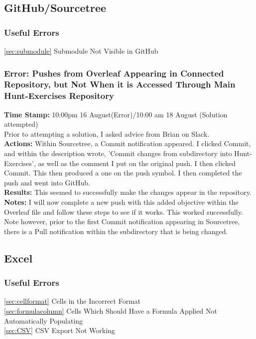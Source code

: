 \documentclass{article}
\begin{document}
\begin{FlushLeft}
\subsection{GitHub/Sourcetree}

\subsubsection{Useful Errors}
\autoref{sec:submodule} Submodule Not Visible in GitHub

\subsubsection{Error: Pushes from Overleaf Appearing in Connected Repository, but Not When it is Accessed Through Main Hunt-Exercises Repository}
\textbf{Time Stamp:} 10:00pm 16 August(Error)/10:00 am 18 August (Solution attempted)\\
Prior to attempting a solution, I asked advice from Brian on Slack.\\
\textbf{Actions:} Within Sourcetree, a Commit notification appeared. I clicked Commit, and within the description wrote, 'Commit changes from subdirectory into Hunt-Exercises', as well as the comment I put on the original push. I then clicked Commit. This then produced a one on the push symbol. I then completed the push and went into GitHub.\\
\textbf{Results:} This seemed to successfully make the changes appear in the repository.\\
\textbf{Notes:} I will now complete a new push with this added objective within the Overleaf file and follow these steps to see if it works. This worked successfully. Note however, prior to the first Commit notification appearing in Sourcetree, there is a Pull notification within the subdirectory that is being changed.

\subsection{Excel}
\subsubsection{Useful Errors}
\autoref{sec:cellformat} Cells in the Incorrect Format\\
\autoref{sec:formulacolumn} Cells Which Should Have a Formula Applied Not Automatically Populating\\
\autoref{sec:CSV} CSV Export Not Working\\


\end{FlushLeft}
\end{document}
